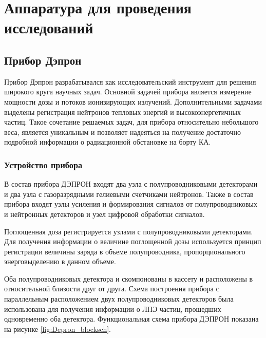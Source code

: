 \chapter{Аппаратура для проведения исследований} \label{chapt2}

\section{Прибор Дэпрон}

Прибор Дэпрон разрабатывался как исследовательский инструмент для решения широкого круга научных задач. Основной задачей прибора является измерение мощности дозы и потоков ионизирующих излучений. Дополнительными задачами выделены регистрация нейтронов тепловых энергий и высокоэнергетичных частиц. Такое сочетание решаемых задач, для прибора относительно небольшого веса,  является уникальным и позволяет надеяться на получение достаточно подробной информации о радиационной обстановке на борту КА. 

\subsection{Устройство прибора}

В состав прибора ДЭПРОН входят два узла с полупроводниковыми детекторами и два узла с газоразрядными гелиевыми счетчиками нейтронов. Также в состав прибора входят узлы усиления и формирования сигналов от полупроводниковых и нейтронных детекторов и узел цифровой обработки сигналов.


Поглощенная доза регистрируется узлами с полупроводниковыми детекторами. Для получения информации о величине поглощенной дозы используется принцип регистрации величины заряда в объеме полупроводника, пропорционального энерговыделению в данном объеме. 


Оба полупроводниковых детектора и скомпонованы в кассету и расположены в относительной близости друг от друга. Схема построения прибора с параллельным расположением двух полупроводниковых детекторов была использована для получения информации о ЛПЭ частиц, прошедших одновременно оба детектора. Функциональная схема прибора ДЭПРОН показана на рисунке \ref{fig:Depron_blocksch}.
 
